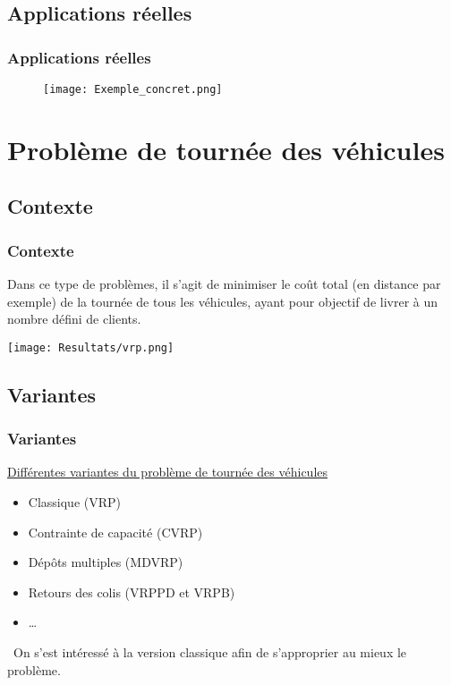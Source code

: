 \documentclass[10pt]{beamer}
\begin{document}
	\subsection{Applications réelles}

	\begin{frame}
		\frametitle{Applications réelles}
		\begin{figure}
			\texttt{[image: Exemple\_concret.png]}
		\end{figure}		
	\end{frame}
	
	\section{Problème de tournée des véhicules}

	\subsection{Contexte}
	
	\begin{frame}
		\frametitle{Contexte}
		Dans ce type de problèmes, il s'agit de minimiser le coût total (en distance par exemple) de la tournée de tous les véhicules, ayant pour objectif de livrer à un nombre défini de clients.
		\begin{center}
			\texttt{[image: Resultats/vrp.png]}
		\end{center}
	\end{frame}

	\subsection{Variantes}
	
	\begin{frame}
		\frametitle{Variantes}
		\underline{Différentes variantes du problème de tournée des véhicules}
		\begin{itemize}[label=—]
			\item Classique (VRP)\pause
			\item Contrainte de capacité (CVRP)\pause
			\item Dépôts multiples (MDVRP)\pause
			\item Retours des colis (VRPPD et VRPB)\pause
			\item \dots 
		\end{itemize}
		\ \newline On s'est intéressé à la version classique afin de s'approprier au mieux le problème.
	\end{frame}
	
\end{document}
